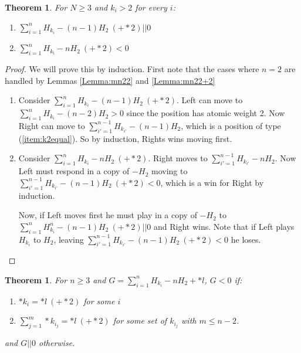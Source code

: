 \documentclass{amsart}
\newcommand{\ds}{\displaystyle}
\newtheorem{theorem}[definition]{Theorem}
\begin{document}
\begin{theorem}
\label{Theorem:k2equal}
For $N\geq 3$ and $k_i>2$ for every $i$:
\begin{enumerate}
\item $\ds \sum_{i=1}^n H_{k_i}-(n-1)H_2 \ (+*2)||0$

\item \label{item:k2equal} $\ds \sum_{i=1}^n H_{k_i} -nH_2\  (+*2)<0$


\end{enumerate}
\end{theorem}
\begin{proof}
We will prove this by induction.  First note that the cases where $n=2$ are handled by Lemmas \ref{Lemma:mn22} and \ref{Lemma:mn22+2}\\

\begin{enumerate}
\item Consider $\ds \sum_{i=1}^n H_{k_i}-(n-1)H_2\ (+*2)$. Left can move to $\ds \sum_{i=1}^n H_{k_i}-(n-2)H_2>0$ since the position has atomic weight 2.  Now Right can move to $\ds \sum_{i'=1}^{n-1} H_{k_{i'}} -(n-1) H_2$, which is a position of type (\ref{item:k2equal}). So by induction, Rights wins moving first.\\

\item Consider $\ds \sum_{i=1}^n H_{k_i} -nH_2\ (+*2)$. Right moves to $\ds \sum_{i'=1}^{n-1} H_{k_{i'}}-nH_2$.  Now Left must respond in a copy of $-H_2$ moving to $\ds \sum_{i'=1}^{n-1} H_{k_{i'}} -(n-1)H_2\ (+*2)<0$, which is a win for Right by induction.
\par Now, if Left moves first he must play in a copy of $-H_2$ to $\sum_{i=1}^n H_{k_i}^n -(n-1)H_2\ (+*2)||0$ and Right wins.  Note that if Left plays $H_{k_i}$ to $H_2$, leaving $\ds \sum_{i'=1}^{n-1} H_{k_{i'}} -(n-1)H_2 \ (+*2)<0$ he loses.
\end{enumerate}
\end{proof}








\begin{theorem}
For $n\geq 3$ and $\ds G=\sum_{i=1}^nH_{k_i} -nH_2+*l$, $G<0$ if:
\begin{enumerate}
\item $*k_i=*l\ (+*2)$ for some $i$
\item $\ds \sum_{j=1}^m *k_{i_j} =*l\ (+*2)$ for some set of $k_{i_j}$ with $m\leq n-2$.
\end{enumerate}

and $G||0$ otherwise.
\end{theorem}
\end{document}
